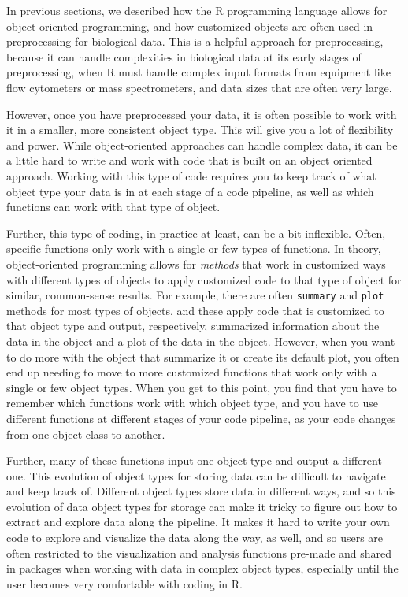 \documentclass[]{tufte-book}
\begin{document}
In previous sections, we described how the R programming language allows for
object-oriented programming, and how customized objects are often used in
preprocessing for biological data. This is a helpful approach for preprocessing,
because it can handle complexities in biological data at its early stages of
preprocessing, when R must handle complex input formats from equipment like
flow cytometers or mass spectrometers, and data sizes that are often very large.

However, once you have preprocessed your data, it is often possible to work with it
in a smaller, more consistent object type. This will give you a lot of flexibility
and power. While object-oriented approaches can handle complex data, it can be a
little hard to write and work with code that is built on an object oriented approach.
Working with this type of code requires you to keep track of what object type your
data is in at each stage of a code pipeline, as well as which functions can work with
that type of object.

Further, this type of coding, in practice at least, can be a bit inflexible.
Often, specific functions only work with a single or few types of functions. In
theory, object-oriented programming allows for \emph{methods} that work in customized
ways with different types of objects to apply customized code to that type of
object for similar, common-sense results. For example, there are often \texttt{summary}
and \texttt{plot} methods for most types of objects, and these apply code that is
customized to that object type and output, respectively, summarized information
about the data in the object and a plot of the data in the object. However, when
you want to do more with the object that summarize it or create its default
plot, you often end up needing to move to more customized functions that work
only with a single or few object types. When you get to this point, you find that
you have to remember which functions work with which object type, and you have to
use different functions at different stages of your code pipeline, as your code
changes from one object class to another.

Further, many of these functions input one object type and output a different
one. This evolution of object types for storing data can be difficult to navigate
and keep track of. Different object types store data in different ways, and so
this evolution of data object types for storage can make it tricky to figure out
how to extract and explore data along the pipeline. It makes it hard to write your
own code to explore and visualize the data along the way, as well, and so users
are often restricted to the visualization and analysis functions pre-made and
shared in packages when working with data in complex object types, especially
until the user becomes very comfortable with coding in R.
\end{document}
